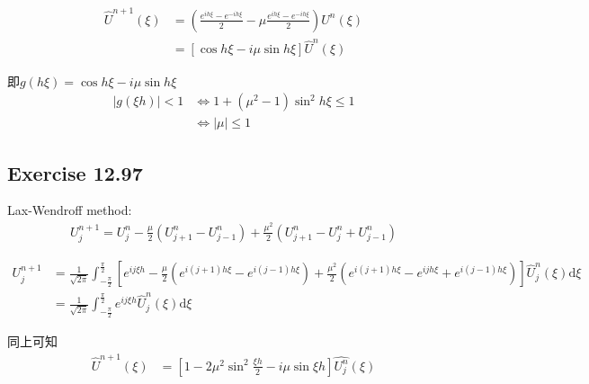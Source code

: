 \documentclass[UTF8]{ctexart}
\newcommand{\dif}{\mathrm{d}}
\begin{document}
\begin{equation}
    \label{eq:12.96-F-2}
    \begin{aligned}
        \hat{U}^{n+1}(\xi) &= (\frac{e^{ih\xi} - e^{-ih\xi}}{2} - \mu\frac{e^{ih\xi} - e^{-ih\xi}}{2})U^{n}(\xi) \\
                           &= [\cos h\xi - i\mu\sin h\xi]\hat{U}^n(\xi) 
    \end{aligned}
\end{equation}

即$g(h\xi) = \cos h\xi - i\mu\sin h\xi$
\begin{equation}
    \label{eq:12.96-F-3}
    \begin{aligned}
        |g(\xi h) | < 1 &\Leftrightarrow  1+(\mu^2-1)\sin^2h\xi \leq 1 \\
                        &\Leftrightarrow  |\mu| \leq  1
    \end{aligned}
\end{equation}


\subsection*{Exercise 12.97}
Lax-Wendroff method:
\begin{equation}
    \label{eq:12.97-LW}
    \begin{aligned}
        U^{n+1}_j = U^n_j - \frac{\mu}{2}(U^n_{j+1}-U^n_{j-1})+\frac{\mu^2}{2}(U^n_{j+1}-U^n_j+U^n_{j-1})
    \end{aligned}
\end{equation}

\begin{equation}
    \label{eq:12.97-F}
    \begin{aligned}
        U^{n+1}_j &= \frac{1}{\sqrt{2\pi}}\int_{-\frac{\pi}{2}}^{\frac{\pi}{2}}
        [e^{ij\xi h} - \frac{\mu}{2}(e^{i(j+1)h\xi} - e^{i(j-1)h\xi}) + \frac{\mu^2}{2}(e^{i(j+1)h\xi} - e^{ijh\xi} + e^{i(j-1)h\xi})]
        \hat{U}^n_j(\xi) \dif \xi \\
        &= \frac{1}{\sqrt{2\pi}}\int_{-\frac{\pi}{2}}^{\frac{\pi}{2}}e^{ij\xi h}\hat{U}^{n}_j(\xi) \dif \xi
    \end{aligned}
\end{equation}

同上可知
\begin{equation}
    \label{eq:12.97-F-2}
    \begin{aligned}
        \hat{U}^{n+1}(\xi) &= [1 - 2\mu^2\sin^2\frac{\xi h}{2} - i\mu\sin\xi h]\hat{U^n_j}(\xi) 
    \end{aligned}
\end{equation}
\end{document}

